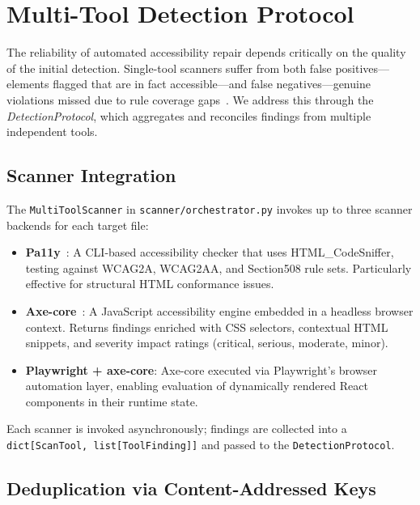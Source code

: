 \documentclass[10pt,conference]{IEEEtran}
\begin{document}
\section{Multi-Tool Detection Protocol}
\label{sec:detection}

The reliability of automated accessibility repair depends critically on the
quality of the initial detection.  Single-tool scanners suffer from both
false positives—elements flagged that are in fact accessible—and false
negatives—genuine violations missed due to rule coverage gaps~\cite{sane2023}.
We address this through the \emph{DetectionProtocol}, which aggregates and
reconciles findings from multiple independent tools.

\subsection{Scanner Integration}

The \texttt{MultiToolScanner} in \texttt{scanner/orchestrator.py} invokes up
to three scanner backends for each target file:

\begin{itemize}
  \item \textbf{Pa11y}~\cite{pa11y}: A CLI-based accessibility checker that
    uses HTML\_CodeSniffer, testing against WCAG2A, WCAG2AA, and Section508
    rule sets.  Particularly effective for structural HTML conformance issues.
  \item \textbf{Axe-core}~\cite{axe}: A JavaScript accessibility engine
    embedded in a headless browser context.  Returns findings enriched with
    CSS selectors, contextual HTML snippets, and severity impact ratings
    (critical, serious, moderate, minor).
  \item \textbf{Playwright + axe-core}: Axe-core executed via Playwright's
    browser automation layer, enabling evaluation of dynamically rendered
    React components in their runtime state.
\end{itemize}

Each scanner is invoked asynchronously; findings are collected into a
\texttt{dict[ScanTool, list[ToolFinding]]} and passed to the
\texttt{DetectionProtocol}.

\subsection{Deduplication via Content-Addressed Keys}
\end{document}
